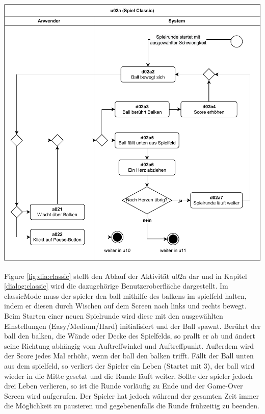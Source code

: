 \vspace*{1cm}

\includegraphics[width=\linewidth]{diagramme/pdf/UML-Activity-u02a.pdf}
\label{fig:dia:classic}
\vspace*{0.5cm}

Figure \ref{fig:dia:classic} stellt den Ablauf der Aktivität u02a dar und in Kapitel \ref{dialog:classic} wird die dazugehörige Benutzeroberfläche dargestellt.
Im \gls{classicMode} muss der \gls{spieler} den \gls{ball} mithilfe des \glspl{balken} im \gls{spielfeld} halten, indem er diesen durch Wischen auf dem Screen nach links und rechts bewegt. Beim Starten einer neuen Spielrunde wird diese mit den ausgewählten Einstellungen (Easy/Medium/Hard) initialisiert und der Ball spawnt. Berührt der \gls{ball} den \gls{balken}, die Wände oder Decke des Spielfelds, so prallt er ab und ändert seine Richtung abhängig vom Auftreffwinkel und Auftreffpunkt. Außerdem wird der Score jedes Mal erhöht, wenn der \gls{ball} den \gls{balken} trifft.
Fällt der Ball unten aus dem \gls{spielfeld}, so verliert der Spieler ein Leben (Startet mit 3), der \gls{ball} wird wieder in die Mitte gesetzt und die Runde läuft weiter. Sollte der \gls{spieler} jedoch drei Leben verlieren, so ist die Runde vorläufig zu Ende und der Game-Over Screen wird aufgerufen.
Der Spieler hat jedoch während der gesamten Zeit immer die Möglichkeit zu pausieren und gegebenenfalls die Runde frühzeitig zu beenden.  


